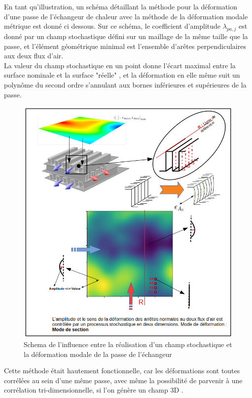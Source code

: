 \documentclass[a4paper,10pt]{article}
\begin{document}
En tant qu'illustration, un schéma détaillant la méthode pour la déformation d'une passe de l'échangeur de chaleur avec la méthode de la déformation modale métrique est donné ci dessous. Sur ce schéma, le coefficient d'amplitude $\lambda_{pa,j}$ est donné par un champ stochastique défini sur un maillage de la même taille que la passe, et l'élément géométrique minimal est l'ensemble d’arêtes perpendiculaires aux deux flux d'air.\\ 
La valeur du champ stochastique en un point donne l'écart maximal entre la surface nominale et la surface "réelle" , et la déformation en elle même suit un polynôme du second ordre s'annulant aux bornes inférieures et supérieures de la passe. 


\begin{figure}[H]
   \centering   
   \includegraphics[scale=0.45]{SchemaModesDeformation.png}
      \caption{Schema de l'influence entre la réalisation d'un champ stochastique et la déformation modale de la passe de l'échangeur}
         \label{SchemaModesDeformation}
\end{figure}

Cette méthode était hautement fonctionnelle, car les déformations sont toutes corrélées au sein d'une même passe, avec même la possibilité de parvenir à une corrélation tri-dimensionnelle, si l'on génère un champ 3D . 
\end{document}
